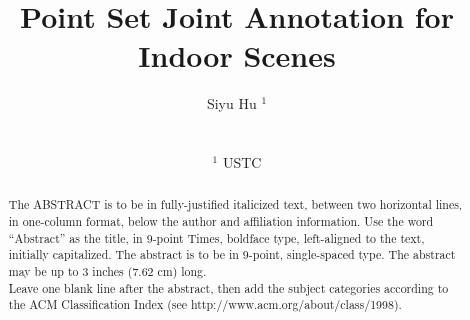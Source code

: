 

\title[Point Set Joint Annotation for Indoor Scenes]%
      {Point Set Joint Annotation for Indoor Scenes}

\author[Siyu Hu]
{\parbox{\textwidth}{\centering Siyu Hu $^1$}
        \\
{\parbox{\textwidth}{\centering $^1$ USTC\\
       } 
}
}

%





\maketitle

\begin{abstract}
   The ABSTRACT is to be in fully-justified italicized text, 
   between two horizontal lines,
   in one-column format, 
   below the author and affiliation information. 
   Use the word ``Abstract'' as the title, in 9-point Times, boldface type, 
   left-aligned to the text, initially capitalized. 
   The abstract is to be in 9-point, single-spaced type.
   The abstract may be up to 3 inches (7.62 cm) long. \\
   Leave one blank line after the abstract, 
   then add the subject categories according to the ACM Classification Index 
   (see http://www.acm.org/about/class/1998).

\begin{classification} %
\end{classification}

\end{abstract}

